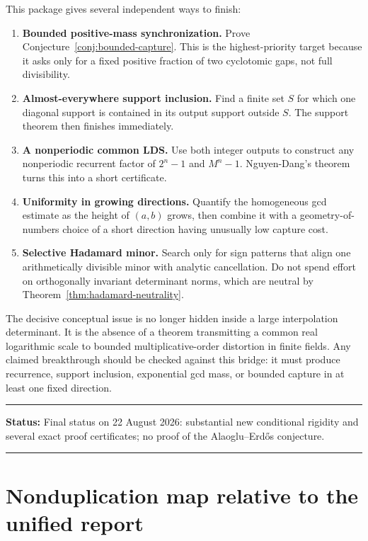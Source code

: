 \documentclass[11pt,oneside]{article}
\theoremstyle{definition}
\theoremstyle{remark}
\newcommand{\AEconj}{Alaoglu--Erd\H{o}s}
\newenvironment{statusbox}[1]
{\begin{center}\begin{minipage}{0.94\textwidth}\hrule\vspace{0.45em}\textbf{Status:} #1\par\vspace{0.35em}}
{\vspace{0.35em}\hrule\end{minipage}\end{center}}
\begin{document}
This package gives several independent ways to finish:
\begin{enumerate}[label=\textbf{P\arabic*.}]
\item \textbf{Bounded positive-mass synchronization.}  Prove
Conjecture~\ref{conj:bounded-capture}.  This is the highest-priority target because it asks
only for a fixed positive fraction of two cyclotomic gaps, not full divisibility.
\item \textbf{Almost-everywhere support inclusion.}  Find a finite set $S$ for which one
diagonal support is contained in its output support outside $S$.  The support theorem then
finishes immediately.
\item \textbf{A nonperiodic common LDS.}  Use both integer outputs to construct any
nonperiodic recurrent factor of $2^n-1$ and $M^n-1$.  Nguyen-Dang's theorem turns this into a
short certificate.
\item \textbf{Uniformity in growing directions.}  Quantify the homogeneous gcd estimate as
the height of $(a,b)$ grows, then combine it with a geometry-of-numbers choice of a short
direction having unusually low capture cost.
\item \textbf{Selective Hadamard minor.}  Search only for sign patterns that align one
arithmetically divisible minor with analytic cancellation.  Do not spend effort on
orthogonally invariant determinant norms, which are neutral by
Theorem~\ref{thm:hadamard-neutrality}.
\end{enumerate}

The decisive conceptual issue is no longer hidden inside a large interpolation determinant.
It is the absence of a theorem transmitting a common real logarithmic scale to bounded
multiplicative-order distortion in finite fields.  Any claimed breakthrough should be
checked against this bridge: it must produce recurrence, support inclusion, exponential gcd
mass, or bounded capture in at least one fixed direction.

\begin{statusbox}{Final status on 22 August 2026: substantial new conditional rigidity and
several exact proof certificates; no proof of the \AEconj{} conjecture.}
\end{statusbox}

\appendix

\section{Nonduplication map relative to the unified report}
\label{app:nonduplication}
\end{document}
